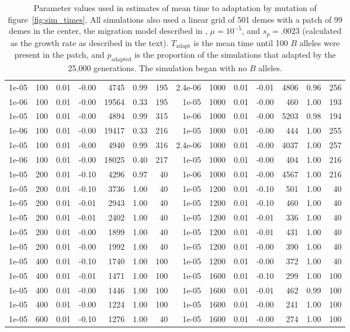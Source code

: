 \begin{table}[ht]
{\begin{tabular}{|rrrrrrr||rrrrrrr|}
  1e-05 & 100 & 0.01 & -0.00 & 4745 & 0.99 & 195 & 2.4e-06 & 1000 & 0.01 & -0.01 & 4806 & 0.96 & 256 \\ 
  1e-06 & 100 & 0.01 & -0.00 & 19564 & 0.33 & 195 & 1e-05 & 1000 & 0.01 & -0.00 & 460 & 1.00 & 193 \\ 
  1e-05 & 100 & 0.01 & -0.00 & 4894 & 0.99 & 315 & 1e-06 & 1000 & 0.01 & -0.00 & 5203 & 0.98 & 194 \\ 
  1e-06 & 100 & 0.01 & -0.00 & 19417 & 0.33 & 216 & 1e-05 & 1000 & 0.01 & -0.00 & 444 & 1.00 & 255 \\ 
  1e-05 & 100 & 0.01 & -0.00 & 4940 & 0.99 & 316 & 2.4e-06 & 1000 & 0.01 & -0.00 & 4037 & 1.00 & 257 \\ 
  1e-06 & 100 & 0.01 & -0.00 & 18025 & 0.40 & 217 & 1e-05 & 1000 & 0.01 & -0.00 & 404 & 1.00 & 216 \\ 
  1e-05 & 200 & 0.01 & -0.10 & 4296 & 0.97 & 40 & 1e-06 & 1000 & 0.01 & -0.00 & 4567 & 1.00 & 216 \\ 
  1e-05 & 200 & 0.01 & -0.10 & 3736 & 1.00 & 40 & 1e-05 & 1200 & 0.01 & -0.10 & 501 & 1.00 & 40 \\ 
  1e-05 & 200 & 0.01 & -0.01 & 2943 & 1.00 & 40 & 1e-05 & 1200 & 0.01 & -0.10 & 460 & 1.00 & 40 \\ 
  1e-05 & 200 & 0.01 & -0.01 & 2402 & 1.00 & 40 & 1e-05 & 1200 & 0.01 & -0.01 & 336 & 1.00 & 40 \\ 
  1e-05 & 200 & 0.01 & -0.00 & 1899 & 1.00 & 40 & 1e-05 & 1200 & 0.01 & -0.01 & 431 & 1.00 & 40 \\ 
  1e-05 & 200 & 0.01 & -0.00 & 1992 & 1.00 & 40 & 1e-05 & 1200 & 0.01 & -0.00 & 390 & 1.00 & 40 \\ 
  1e-05 & 400 & 0.01 & -0.10 & 1740 & 1.00 & 100 & 1e-05 & 1200 & 0.01 & -0.00 & 372 & 1.00 & 40 \\ 
  1e-05 & 400 & 0.01 & -0.01 & 1471 & 1.00 & 100 & 1e-05 & 1600 & 0.01 & -0.10 & 299 & 1.00 & 100 \\ 
  1e-05 & 400 & 0.01 & -0.00 & 1446 & 1.00 & 100 & 1e-05 & 1600 & 0.01 & -0.01 & 462 & 0.99 & 100 \\ 
  1e-05 & 400 & 0.01 & -0.00 & 1224 & 1.00 & 100 & 1e-05 & 1600 & 0.01 & -0.00 & 241 & 1.00 & 100 \\ 
  1e-05 & 600 & 0.01 & -0.10 & 1276 & 1.00 & 40 & 1e-05 & 1600 & 0.01 & -0.00 & 274 & 1.00 & 100 \\ 
   \hline
\end{tabular}
}
\caption{
            Parameter values used in estimates of mean time to adaptation by mutation of figure~\ref{fig:sim_times}.
            All simulations also used a linear grid of 501 demes with a patch of 99 demes in the center, 
            the migration model described in ,
            $\mu=10^{-5}$, and $s_p=.0023$ (calculated as the growth rate as described in the text).
            $T_\text{adapt}$ is the mean time until 100 $B$ alleles were present in the patch,
            and $p_\text{adapted}$ is the proportion of the simulations that adapted by the 25,000 generations.
            The simulation began with no $B$ alleles.
            } 
\label{stab:mutation_params}
\end{table}
